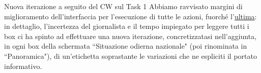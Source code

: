 \begin{bclogo}{Nuova iterazione a seguito del CW sul Task 1}
    Abbiamo ravvisato margini di miglioramento dell'interfaccia per l'esecuzione di tutte le azioni, fuorché l'\hyperref[cw1:f]{ultima}: in dettaglio, l'incertezza del giornalista e il tempo impiegato per leggere tutti i box ci ha spinto ad effettuare una nuova iterazione, concretizzatasi nell'aggiunta, in ogni box della schermata ``Situazione odierna nazionale" (poi rinominata in ``Panoramica"), di un'etichetta soprastante le variazioni che ne espliciti il portato informativo.
\end{bclogo}